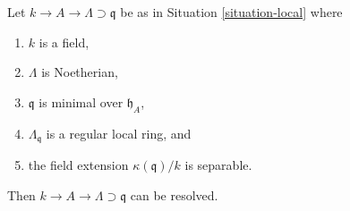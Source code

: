 \begin{lemma}
\label{lemma-resolve-special}
Let $k \to A \to \Lambda \supset \mathfrak q$ be as in
Situation \ref{situation-local} where
\begin{enumerate}
\item $k$ is a field,
\item $\Lambda$ is Noetherian,
\item $\mathfrak q$ is minimal over $\mathfrak h_A$,
\item $\Lambda_\mathfrak q$ is a regular local ring, and
\item the field extension $\kappa(\mathfrak q)/k$ is separable.
\end{enumerate}
Then $k \to A \to \Lambda \supset \mathfrak q$ can be resolved.
\end{lemma}

